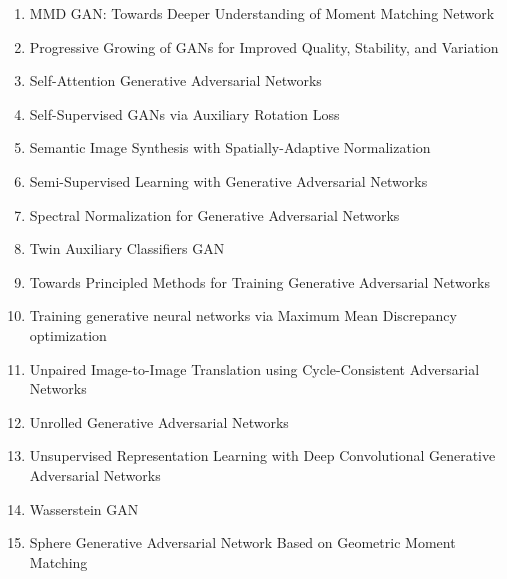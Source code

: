 \documentclass[acmlarge]{acmart}
\begin{document}
\begin{enumerate}
	\item MMD GAN: Towards Deeper Understanding of Moment Matching Network \cite{li2017mmd} 

	\item Progressive Growing of GANs for Improved Quality, Stability, and Variation \cite{karras2017progressive} 

	\item Self-Attention Generative Adversarial Networks \cite{zhang2018selfattention} 

	\item Self-Supervised GANs via Auxiliary Rotation Loss \cite{chen2018selfsupervised} 

	\item Semantic Image Synthesis with Spatially-Adaptive Normalization \cite{park2019semantic} 

	\item Semi-Supervised Learning with Generative Adversarial Networks \cite{odena2016semisupervised} 

	\item Spectral Normalization for Generative Adversarial Networks \cite{miyato2018spectral} 

	\item Twin Auxiliary Classifiers GAN \cite{gong2019twin} 

	\item Towards Principled Methods for Training Generative Adversarial Networks \cite{arjovsky2017principled} 

	\item Training generative neural networks via Maximum Mean Discrepancy optimization \cite{dziugaite2015training} 

	\item Unpaired Image-to-Image Translation using Cycle-Consistent Adversarial Networks \cite{zhu2017unpaired} 

	\item Unrolled Generative Adversarial Networks \cite{metz2016unrolled} 

	\item Unsupervised Representation Learning with Deep Convolutional Generative Adversarial Networks \cite{radford2015unsupervised} 

	\item Wasserstein GAN \cite{arjovsky2017wasserstein} 

	\item Sphere Generative Adversarial Network Based on Geometric Moment Matching \cite{Park2019SphereGA} 


\end{enumerate}
\end{document}
